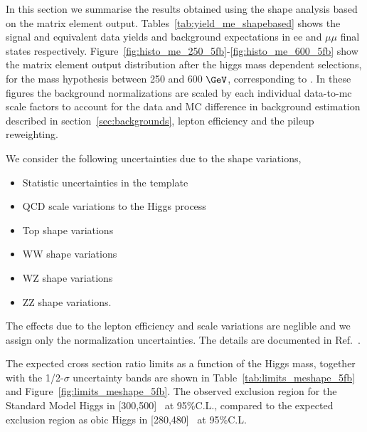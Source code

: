 
In this section we summarise the results obtained using the shape analysis based on the 
matrix element output. 
Tables~\ref{tab:yield_me_shapebased} shows the signal and 
equivalent data yields and background expectations in ee and $\mu\mu$ final states respectively. 
Figure~\ref{fig:histo_me_250_5fb}-\ref{fig:histo_me_600_5fb} show the matrix element output distribution 
after the higgs mass dependent selections, for the mass hypothesis between 250 and 600 $\GeV$, 
corresponding to \intlumi. In these figures the background normalizations are scaled by 
each individual data-to-mc scale factors to account for the data and MC difference in 
background estimation described in section~\ref{sec:backgrounds}, 
lepton efficiency and the pileup reweighting. 



We consider the following uncertainties due to the shape variations, 
\begin{itemize}
\item {Statistic uncertainties in the template}
\item {QCD scale variations to the Higgs process}
\item {Top shape variations}
\item {WW shape variations}
\item {WZ shape variations}
\item {ZZ shape variations}.
\end{itemize}
The effects due to the lepton efficiency and scale variations are neglible and we assign only 
the normalization uncertainties. 
The details are documented in Ref.~\cite{shapeananote}. 

The expected cross section ratio limits as a function of the Higgs mass, together with the 1/2-$\sigma$ uncertainty 
bands are shown in Table~\ref{tab:limits_meshape_5fb} and Figure~\ref{fig:limits_meshape_5fb}. 
The observed exclusion region for the Standard Model Higgs in [300,500]~\GeV{} at 95\%C.L., 
compared to the expected exclusion region as obic Higgs in [280,480]~\GeV{} at 95\%C.L.



